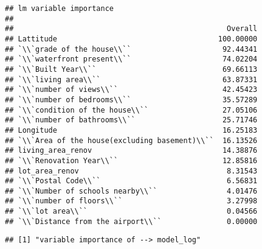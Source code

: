 \documentclass[
]{article}
\begin{document}
\begin{verbatim}
## lm variable importance
## 
##                                                 Overall
## Lattitude                                     100.00000
## `\\`grade of the house\\``                     92.44341
## `\\`waterfront present\\``                     74.02204
## `\\`Built Year\\``                             69.66113
## `\\`living area\\``                            63.87331
## `\\`number of views\\``                        42.45423
## `\\`number of bedrooms\\``                     35.57289
## `\\`condition of the house\\``                 27.05106
## `\\`number of bathrooms\\``                    25.71746
## Longitude                                      16.25183
## `\\`Area of the house(excluding basement)\\``  16.13526
## living_area_renov                              14.38876
## `\\`Renovation Year\\``                        12.85816
## lot_area_renov                                  8.31543
## `\\`Postal Code\\``                             6.56831
## `\\`Number of schools nearby\\``                4.01476
## `\\`number of floors\\``                        3.27998
## `\\`lot area\\``                                0.04566
## `\\`Distance from the airport\\``               0.00000
\end{verbatim}

\begin{verbatim}
## [1] "variable importance of --> model_log"
\end{verbatim}
\end{document}
